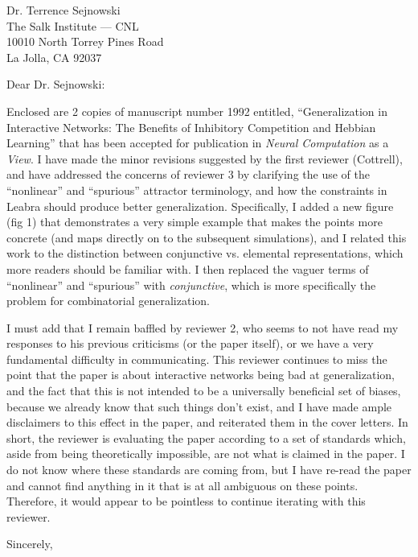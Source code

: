 \documentclass [11pt]{letter}
\begin{document}
\begin{letter}
{Dr. Terrence Sejnowski\\
The Salk Institute --- CNL\\
10010 North Torrey Pines Road\\
La Jolla, CA 92037\\}

\opening{Dear Dr. Sejnowski:}

Enclosed are 2 copies of manuscript number 1992 entitled,
``Generalization in Interactive Networks: The Benefits of Inhibitory
Competition and Hebbian Learning'' that has been accepted for
publication in {\em Neural Computation} as a {\em View}.  I have made
the minor revisions suggested by the first reviewer (Cottrell), and
have addressed the concerns of reviewer 3 by clarifying the use of the
``nonlinear'' and ``spurious'' attractor terminology, and how the
constraints in Leabra should produce better generalization.
Specifically, I added a new figure (fig 1) that demonstrates a very
simple example that makes the points more concrete (and maps directly
on to the subsequent simulations), and I related this work to the
distinction between conjunctive vs. elemental representations, which
more readers should be familiar with.  I then replaced the vaguer
terms of ``nonlinear'' and ``spurious'' with {\em conjunctive}, which
is more specifically the problem for combinatorial generalization.

I must add that I remain baffled by reviewer 2, who seems to not have
read my responses to his previous criticisms (or the paper itself), or
we have a very fundamental difficulty in communicating.  This reviewer
continues to miss the point that the paper is about interactive
networks being bad at generalization, and the fact that this is not
intended to be a universally beneficial set of biases, because we
already know that such things don't exist, and I have made ample
disclaimers to this effect in the paper, and reiterated them in the
cover letters.  In short, the reviewer is evaluating the paper
according to a set of standards which, aside from being theoretically
impossible, are not what is claimed in the paper.  I do not know where
these standards are coming from, but I have re-read the paper and
cannot find anything in it that is at all ambiguous on these points.
Therefore, it would appear to be pointless to continue iterating with
this reviewer.

\closing{Sincerely,}

\end{letter}
\end{document}
